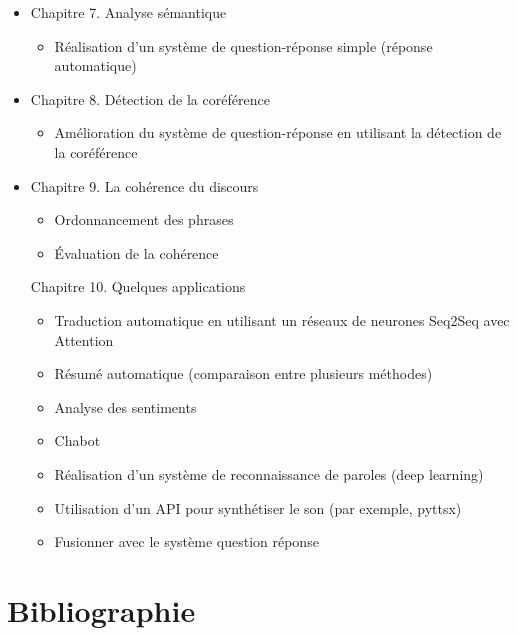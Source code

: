 \documentclass[11pt, a4paper]{article}
\begin{document}
\begin{itemize}
	\item Chapitre 7. Analyse sémantique
	\begin{itemize}
		\item Réalisation d'un système de question-réponse simple (réponse automatique)
	\end{itemize}

	\item Chapitre 8. Détection de la coréférence
	\begin{itemize}
		\item Amélioration du système de question-réponse en utilisant la détection de la coréférence
	\end{itemize}

	\item Chapitre 9. La cohérence du discours
	\begin{itemize}
		\item Ordonnancement des phrases
		\item Évaluation de la cohérence
	\end{itemize}

	Chapitre 10. Quelques applications
	\begin{itemize}
		\item Traduction automatique en utilisant un réseaux de neurones Seq2Seq avec Attention
		\item Résumé automatique (comparaison entre plusieurs méthodes)
		\item Analyse des sentiments 
		\item Chabot 
		\item Réalisation d'un système de reconnaissance de paroles (deep learning)
		\item Utilisation d'un API pour synthétiser le son (par exemple, pyttsx)
		\item Fusionner avec le système question réponse
	\end{itemize}

\end{itemize}

%
%

\section{Bibliographie}

\nocite{*}

%


\end{document}

